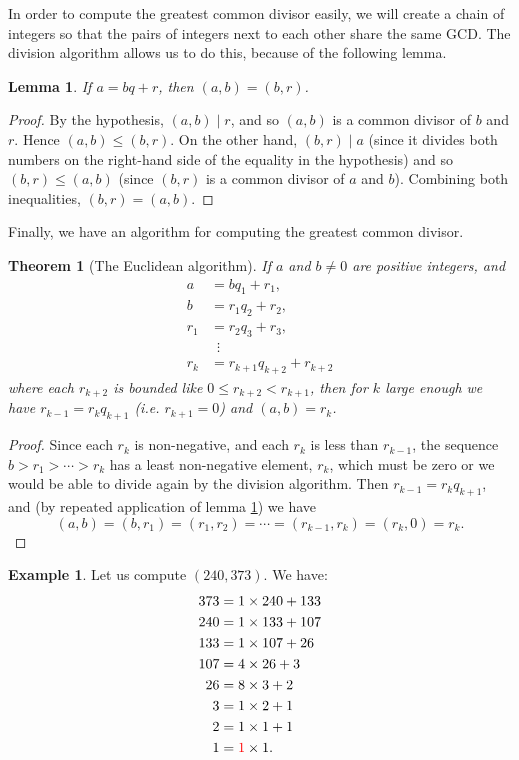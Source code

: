 \documentclass[a4paper,leqno]{article}
\numberwithin{equation}{section}
\newtheorem{thm}[equation]{Theorem}
\newtheorem{lem}[equation]{Lemma}
\theoremstyle{definition}
\newtheorem{ex}[equation]{Example}
\theoremstyle{remark}
\begin{document}
In order to compute the greatest common divisor easily, we will create a chain of integers so that the pairs of integers next to each other
share the same GCD. The division algorithm allows us to do this, because of the following lemma.

\begin{lem}\label{lem:euclidalg}
  If $ a = bq + r $, then $ (a,b) = (b,r) $.
\end{lem}
\begin{proof}
  By the hypothesis, $ (a,b) \mid r $, and so $ (a,b) $ is a common divisor of $ b $ and $ r $. Hence $ (a,b) \leq (b,r) $. On the other hand, $ (b,r) \mid a $
  (since it divides both numbers on the right-hand side of the equality in the hypothesis) and so $ (b,r) \leq (a,b) $ (since $ (b,r) $ is a common divisor
  of $ a $ and $ b $). Combining both inequalities, $ (b,r) = (a,b) $.
\end{proof}

Finally, we have an algorithm for computing the greatest common divisor.
\begin{thm}[The Euclidean algorithm]
  If $ a $ and $ b \neq 0 $ are positive integers, and
  \begin{align*}
    a &= bq_1 + r_1,\\
    b &= r_1q_2 + r_2,\\
    r_1 &= r_2 q_3 + r_3,\\\
    &\enspace \vdots\\
    r_k &= r_{k + 1} q_{k + 2} + r_{k + 2}
  \end{align*}
  where each $ r_{k + 2} $ is bounded like $ 0 \leq r_{k + 2} < r_{k + 1} $, then for $ k $ large enough
  we have $ r_{k - 1} = r_{k} q_{k + 1} $ (i.e. $ r_{k + 1} = 0 $) and $ (a,b) = r_k $.
\end{thm}
\begin{proof}
  Since each $ r_k $ is non-negative, and each $ r_k $ is less than $ r_{k - 1} $, the sequence $ b > r_1 > \cdots > r_k $
  has a least non-negative element, $ r_k $, which must be zero or we would be able to divide again by the division algorithm.
  Then $ r_{k - 1} = r_{k} q_{k + 1} $, and (by repeated application of lemma \ref{lem:euclidalg}) we have
  \begin{displaymath}
    (a,b) = (b,r_1) = (r_1, r_2) = \cdots = (r_{k - 1}, r_{k}) = (r_{k}, 0) = r_k.
  \end{displaymath}
\end{proof}

\begin{ex}
  Let us compute $ (240, 373) $. We have:
  \begin{align*}
    373 &= 1 \times 240 + 133\\
    240 &= 1 \times 133 + 107\\
    133 &= 1 \times 107 + 26\\
    107 &= 4 \times 26 + 3\\
    26 &= 8 \times 3 + 2\\
    3 &= 1 \times 2 + 1\\
    2 &= 1 \times 1 + 1\\
    1 &= {\color{red}1} \times 1.
  \end{align*}
\end{ex}
\end{document}
